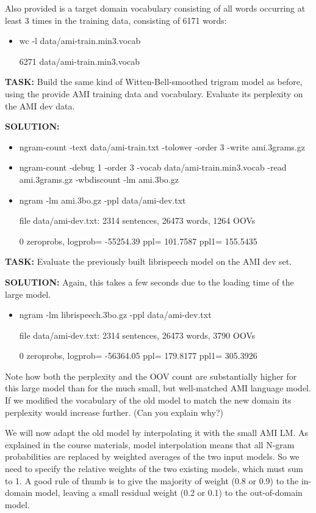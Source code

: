 Also provided is a target domain vocabulary consisting of all words occurring at least 3 times in the training data, consisting of 6171 words:
\begin{itemize}
	\item wc -l data/ami-train.min3.vocab

			6271 data/ami-train.min3.vocab
\end{itemize}

{\bf TASK:} Build the same kind of Witten-Bell-smoothed trigram model as before, using the provide AMI training data and vocabulary. Evaluate its perplexity on the AMI dev data.

{\bf SOLUTION:}
\begin{itemize}
	\item ngram-count -text data/ami-train.txt -tolower -order 3 -write ami.3grams.gz
	\item ngram-count -debug 1 -order 3 -vocab data/ami-train.min3.vocab -read ami.3grams.gz -wbdiscount -lm ami.3bo.gz
	\item ngram -lm ami.3bo.gz -ppl data/ami-dev.txt

			file data/ami-dev.txt: 2314 sentences, 26473 words, 1264 OOVs

			0 zeroprobs, logprob= -55254.39 ppl= 101.7587 ppl1= 155.5435
\end{itemize}

{\bf TASK:} Evaluate the previously built librispeech model on the AMI dev set.

{\bf SOLUTION:} Again, this takes a few seconds due to the loading time of the large model.
\begin{itemize}
	\item ngram -lm librispeech.3bo.gz -ppl data/ami-dev.txt

			file data/ami-dev.txt: 2314 sentences, 26473 words, 3790 OOVs

			0 zeroprobs, logprob= -56364.05 ppl= 179.8177 ppl1= 305.3926
\end{itemize}

Note how both the perplexity and the OOV count are substantially higher for this large model than for the much small, but well-matched AMI language model. If we modified the vocabulary of the old model to match the new domain its perplexity would increase further. (Can you explain why?)

We will now adapt the old model by interpolating it with the small AMI LM. As explained in the course materials, model interpolation means that all N-gram probabilities are replaced by weighted averages of the two input models. So we need to specify the relative weights of the two existing models, which must sum to 1. A good rule of thumb is to give the majority of weight (0.8 or 0.9) to the in-domain model, leaving a small residual weight (0.2 or 0.1) to the out-of-domain model.

